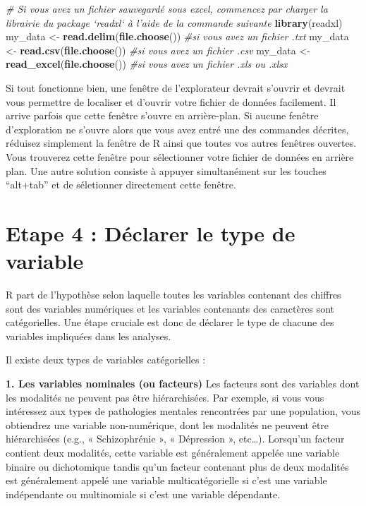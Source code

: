 \documentclass[
]{book}
\newenvironment{Shaded}{\begin{snugshade}}{\end{snugshade}}
\newcommand{\CommentTok}[1]{\textcolor[rgb]{0.56,0.35,0.01}{\textit{#1}}}
\newcommand{\KeywordTok}[1]{\textcolor[rgb]{0.13,0.29,0.53}{\textbf{#1}}}
\newcommand{\NormalTok}[1]{#1}
\newcommand{\StringTok}[1]{\textcolor[rgb]{0.31,0.60,0.02}{#1}}
\begin{document}
\begin{Shaded}
\begin{Highlighting}[]
\CommentTok{# Si vous avez un fichier sauvegardé sous excel, commencez par charger la librairie du package `readxl` à l’aide de la commande suivante}
\KeywordTok{library}\NormalTok{(readxl) }
\NormalTok{my_data <-}\StringTok{ }\KeywordTok{read.delim}\NormalTok{(}\KeywordTok{file.choose}\NormalTok{()) }\CommentTok{#si vous avez un fichier .txt}
\NormalTok{my_data <-}\StringTok{ }\KeywordTok{read.csv}\NormalTok{(}\KeywordTok{file.choose}\NormalTok{()) }\CommentTok{#si vous avez un fichier .csv}
\NormalTok{my_data <-}\StringTok{ }\KeywordTok{read_excel}\NormalTok{(}\KeywordTok{file.choose}\NormalTok{()) }\CommentTok{#si vous avez un fichier .xls ou .xlsx}
\end{Highlighting}
\end{Shaded}

Si tout fonctionne bien, une fenêtre de l'explorateur devrait s'ouvrir et devrait vous permettre de localiser et d'ouvrir votre fichier de données facilement. Il arrive parfois que cette fenêtre s'ouvre en arrière-plan. Si aucune fenêtre d'exploration ne s'ouvre alors que vous avez entré une des commandes décrites, réduisez simplement la fenêtre de R ainsi que toutes vos autres fenêtres ouvertes. Vous trouverez cette fenêtre pour sélectionner votre fichier de données en arrière plan.
Une autre solution consiste à appuyer simultanément sur les touches ``alt+tab'' et de séletionner directement cette fenêtre.

\hypertarget{etape-4-duxe9clarer-le-type-de-variable}{%
\section{Etape 4 : Déclarer le type de variable}\label{etape-4-duxe9clarer-le-type-de-variable}}

R part de l'hypothèse selon laquelle toutes les variables contenant des chiffres sont des variables numériques et les variables contenants des caractères sont catégorielles. Une étape cruciale est donc de déclarer le type de chacune des variables impliquées dans les analyses.

Il existe deux types de variables catégorielles :

\textbf{1. Les variables nominales (ou facteurs)}
Les facteurs sont des variables dont les modalités ne peuvent pas être hiérarchisées. Par exemple, si vous vous intéressez aux types de pathologies mentales rencontrées par une population, vous obtiendrez une variable non-numérique, dont les modalités ne peuvent être hiérarchisées (e.g., « Schizophrénie », « Dépression », etc\ldots). Lorsqu'un facteur contient deux modalités, cette variable est généralement appelée une variable binaire ou dichotomique tandis qu'un facteur contenant plus de deux modalités est généralement appelé une variable multicatégorielle si c'est une variable indépendante ou multinomiale si c'est une variable dépendante.
\end{document}
